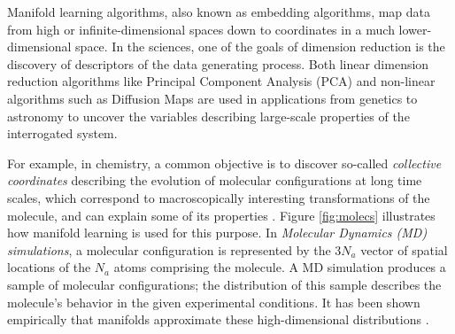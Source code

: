 Manifold learning algorithms, also known as embedding algorithms, map
data from high or infinite-dimensional spaces down
to coordinates in a much lower-dimensional space. In the sciences, one
of the goals of dimension reduction is the discovery of descriptors of
the data generating process. Both linear dimension reduction
algorithms like Principal Component Analysis (PCA) and non-linear algorithms
such as Diffusion Maps \citep{coifman:06} are used in applications from genetics to astronomy to uncover the variables describing
large-scale properties of the interrogated system.

For example, in chemistry, a common objective is to discover so-called
{\em collective coordinates} describing the evolution of molecular
configurations at long time scales, which correspond to
macroscopically interesting transformations of the molecule, and can
explain some of its
properties \citep{clementiOnuchicNymeyer:00,Noe2017-up}.
Figure \ref{fig:molecs} illustrates how manifold learning is used for this purpose. In {\em Molecular Dynamics (MD) simulations}, a molecular configuration is represented by the $3N_a$ vector of spatial locations of the $N_a$ atoms comprising the molecule. A MD simulation produces a sample of molecular configurations; the distribution of this sample describes the molecule's behavior in the given experimental conditions. It has been shown empirically that manifolds  approximate these high-dimensional distributions \citep{Dsilva13-Nonlinear}. 

